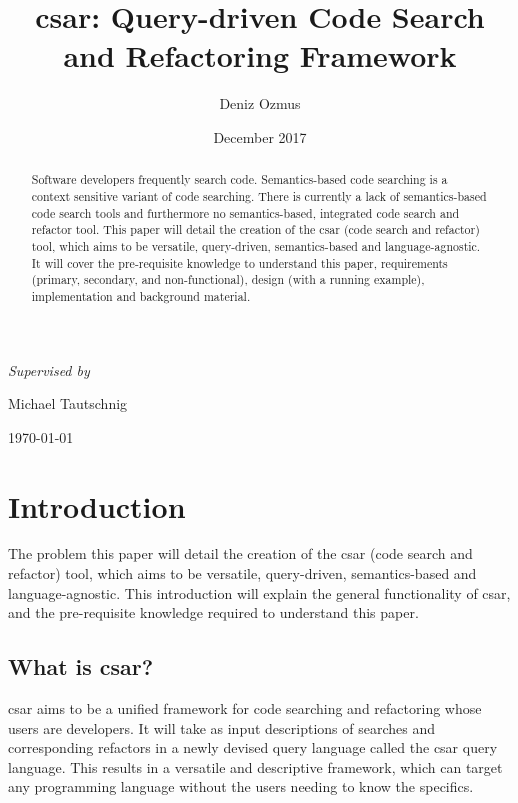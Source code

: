 \documentclass[12pt, letterpaper]{article}
\title{csar: Query-driven Code Search and Refactoring Framework}
\author{Deniz Ozmus}
\date{December 2017}
\def \supervisor {Michael Tautschnig}
\begin{document}
\nocite{*}

\begin{titlepage}
  \centering
  {\Large \MyTitle\par}
  \vspace{3cm}
  {\MyAuthor\par}
  \vspace{0.5cm}
  {\itshape Supervised by }{ \supervisor\par}
  \vspace{13cm}
  {\today\par}
\end{titlepage}

\begin{abstract}
  Software developers frequently search code.
  Semantics-based code searching is a context sensitive variant of code searching.
  There is currently a lack of semantics-based code search tools and furthermore no semantics-based, integrated code search and refactor tool.
  This paper will detail the creation of the csar (code search and refactor) tool, which aims to be versatile, query-driven, semantics-based and language-agnostic.
  It will cover the pre-requisite knowledge to understand this paper, requirements (primary, secondary, and non-functional), design (with a running example), implementation and background material.
\end{abstract}
\newpage

\tableofcontents
\newpage

\section{Introduction}
The problem this paper will detail the creation of the csar (code search and refactor) tool, which aims to be versatile, query-driven, semantics-based and language-agnostic.
This introduction will explain the general functionality of csar, and the pre-requisite knowledge required to understand this paper.

\subsection{What is csar?}
csar aims to be a unified framework for code searching and refactoring whose users are developers.
It will take as input descriptions of searches and corresponding refactors in a newly devised query language called the csar query language.
This results in a versatile and descriptive framework, which can target any programming language without the users needing to know the specifics.
\end{document}
